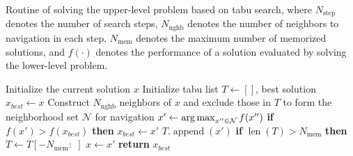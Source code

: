 \begin{algorithm}[tb]
\caption{\small{Routine of solving the upper-level problem based on tabu search, where $N_{\text{step}}$ denotes the number of search steps, $N_{\text{nghb}}$ denotes the number of neighbors to navigation in each step, $N_{\text{mem}}$ denotes the maximum number of memorized solutions, and $f(\cdot)$ denotes the performance of a solution evaluated by solving the lower-level problem.}}
\label{alg:tabu}
\small
\begin{algorithmic}[1]
\STATE Initialize the current solution $x$
\STATE Initialize tabu list $T \gets []$, best solution $x_{best} \gets x$
\STATE {\color{gray}{/* Iterative Neighborhood Search */}}
    \STATE Construct $N_{\text{nghb}}$ neighbors of $x$ and exclude those in $T$ to form the neighborhood set $\mathcal{N}$ for navigation
    \STATE $x' \gets \operatorname*{arg\,max}_{x'' \in \mathcal{N}} f(x'')$
    \STATE \textbf{if} $f(x') > f(x_{best})$ \textbf{then} $x_{best} \gets x'$
    \STATE $T.\operatorname{append}(x')$
    \STATE \textbf{if} $\operatorname{len}(T) > N_{\text{mem}}$ \textbf{then} $T \gets T[-N_{\text{mem}}:\;]$
    \STATE $x \gets x'$
\ENDFOR
\STATE \textbf{return} $x_{best}$
\ENDFUNCTION
\end{algorithmic}
\end{algorithm}